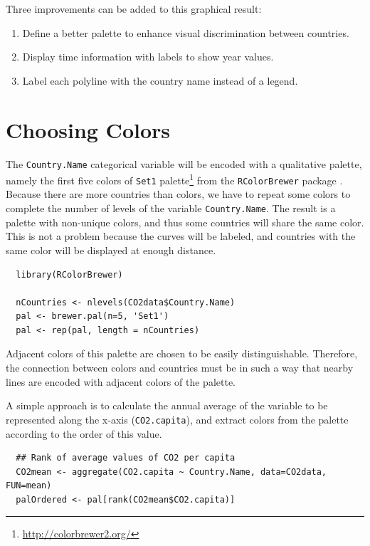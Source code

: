 \documentclass[smallroyalvopaper]{memoir}
\begin{document}
Three improvements can be added to this graphical result: 
\begin{enumerate}
\item Define a better palette to enhance visual discrimination between
countries.
\item Display time information with labels to show year values.
\item Label each polyline with the country name instead of a legend.
\end{enumerate}

\section{Choosing Colors}
\label{sec:orgc74a42f}
The \texttt{Country.Name} categorical variable will be encoded with a
qualitative palette, namely the first five colors of \texttt{Set1}
palette\footnote{\url{http://colorbrewer2.org/}} from the \texttt{RColorBrewer} package
\cite{Neuwirth2011}. Because there are more countries than colors, we
have to repeat some colors to complete the number of levels of the
variable \texttt{Country.Name}. The result is a palette with non-unique
colors, and thus some countries will share the same color. This is not
a problem because the curves will be labeled, and countries with the
same color will be displayed at enough distance.


\lstset{language=r,label= ,caption= ,captionpos=b,numbers=none}
\begin{lstlisting}
  library(RColorBrewer)
  
  nCountries <- nlevels(CO2data$Country.Name)
  pal <- brewer.pal(n=5, 'Set1')
  pal <- rep(pal, length = nCountries)
\end{lstlisting}

Adjacent colors of this palette are chosen to be easily
distinguishable. Therefore, the connection between colors and
countries must be in such a way that nearby lines are encoded
with adjacent colors of the palette.

A simple approach is to calculate the annual average of the
variable to be represented along the x-axis (\texttt{CO2.capita}), and
extract colors from the palette according to the order of this
value.  


\lstset{language=r,label= ,caption= ,captionpos=b,numbers=none}
\begin{lstlisting}
  ## Rank of average values of CO2 per capita
  CO2mean <- aggregate(CO2.capita ~ Country.Name, data=CO2data, FUN=mean)
  palOrdered <- pal[rank(CO2mean$CO2.capita)]  
\end{lstlisting}
\end{document}
